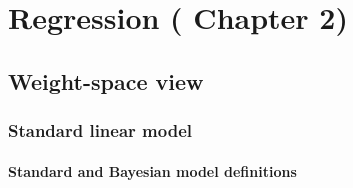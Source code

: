 \documentclass[12pt]{article}
\begin{document}
\section{Regression (\cite{gp-ml} Chapter 2)}



\subsection{Weight-space view}


\subsubsection{Standard linear model}

\paragraph{Standard and Bayesian model definitions}
\end{document}
